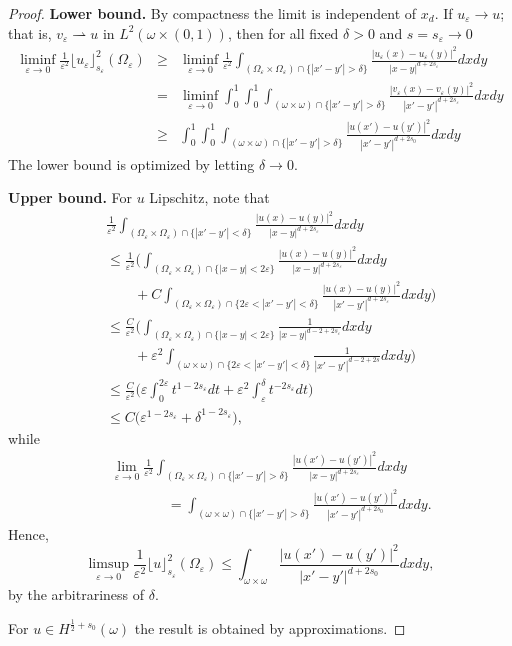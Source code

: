 \documentclass[11pt]{article}
\def\e{\varepsilon}
\newcommand{\weak}{\rightharpoonup}
\begin{document}
\begin{proof}
{\bf Lower bound.} 
By compactness the limit is independent of $x_d$.
If $u_\e\to u$; that is, $v_\e\weak u$ in $L^2(\omega\times(0,1))$, then for all fixed $\delta>0$ and $s=s_\e\to 0$
\begin{eqnarray*}\liminf_{\e\to 0}\frac{1}{\e^2} \lfloor u_\e\rfloor_{s_\e}^2(\Omega_\e)
&\ge& \liminf_{\e\to 0}\frac{1}{\e^2}\int_{(\Omega_\e\times \Omega_\e)\cap \{|x'-y'|>\delta\}}\frac{|u_\e(x)-u_\e(y)|^2}{|x-y|^{d+2s_\e}}dx dy
\\
&=&\liminf_{\e\to 0}\int_0^1\int_0^1\int_{(\omega\times\omega)\cap \{|x'-y'|>\delta\}}\frac{|v_\e(x)-v_\e(y)|^2}{|x'-y'|^{d+2s_\e}}dx dy
\\
&\ge&\int_0^1\int_0^1\int_{(\omega\times\omega)\cap \{|x'-y'|>\delta\}}\frac{|u(x')-u(y')|^2}{|x'-y'|^{d+2s_0}}dx dy
\end{eqnarray*}
The lower bound is optimized by letting $\delta\to0$.

\bigskip
{\bf Upper bound.} For $u$ Lipschitz, note that
\begin{eqnarray*}
&&\frac{1}{\e^2}\int_{(\Omega_\e\times \Omega_\e)\cap \{|x'-y'|<\delta\}}\frac{|u(x)-u(y)|^2}{|x-y|^{d+2s_\e}}dx dy
\\
&&\le \frac{1}{\e^2}\Big(\int_{(\Omega_\e\times \Omega_\e)\cap \{|x-y|< 2\e\}}\frac{|u(x)-u(y)|^2}{|x-y|^{d+2s_\e}}dx dy
\\&&\qquad +
C\int_{(\Omega_\e\times \Omega_\e)\cap \{2\e<|x'-y'|<\delta\}}\frac{|u(x)-u(y)|^{2}}{|x'-y'|^{d+2s_\e}}dx dy\Big)
\\
&&\le \frac{C}{\e^2}\Big(\int_{(\Omega_\e\times \Omega_\e)\cap \{|x-y|< 2\e\}}\frac{1}{|x-y|^{d-2+2s_\e}}dx dy
\\&&\qquad +
\e^2\int_{(\omega\times\omega)\cap \{2\e<|x'-y'|<\delta\}}\frac{1}{|x'-y'|^{d-2+2s}}dx dy\Big)
\\
&&\le \frac{C}{\e^2}\Big(\e\int_0^{2\e}t^{1-2s_\e}dt
+
\e^2\int_{\e}^{\delta}t^{-2s_\e}dt\Big)
\\
&&\le C\big(\e^{1-2s_\e}
+
\delta^{1-2s_\e}\big),
\end{eqnarray*}
while
\begin{eqnarray*}
&&\lim_{\e\to 0}\frac{1}{\e^2}\int_{(\Omega_\e\times \Omega_\e)\cap \{|x'-y'|>\delta\}}\frac{|u(x')-u(y')|^2}{|x-y|^{d+2s_\e}}dx dy
\\ &&\qquad\qquad
=\int_{(\omega\times\omega)\cap \{|x'-y'|>\delta\}}\frac{|u(x')-u(y')|^2}{|x'-y'|^{d+2s_0}}dx dy.
\end{eqnarray*}
Hence, 
$$\limsup_{\e\to 0}\frac{1}{\e^2} \lfloor u\rfloor_{s_\e}^2(\Omega_\e)
\le\int_{\omega\times\omega}\frac{|u(x')-u(y')|^2}{|x'-y'|^{d+2s_0}}dx dy,
$$
by the arbitrariness of $\delta$.

For $u\in H^{\frac12+s_0}(\omega)$ the result is obtained by approximations.
\end{proof}
\end{document}
